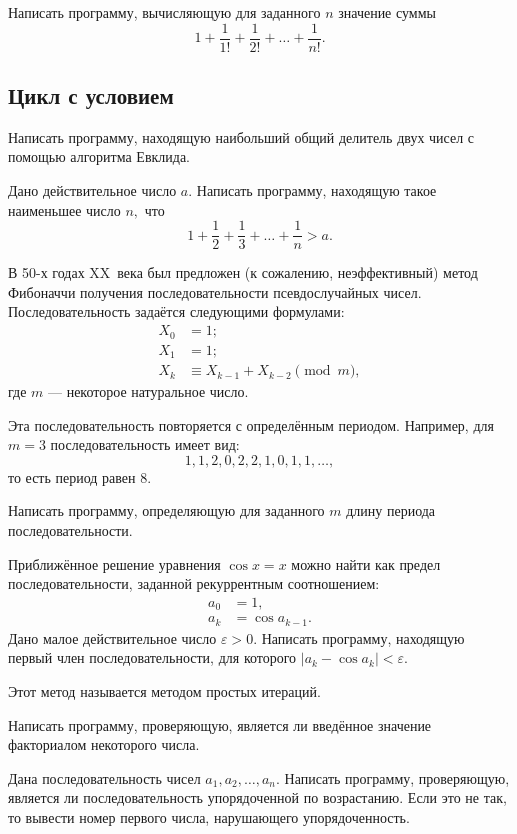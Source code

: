 \task Написать программу, вычисляющую для заданного $n$ значение суммы
\[
1+\frac1{1!} + \frac{1}{2!} + \ldots + \frac1{n!}.
\]

\subsection{Цикл с условием}

\task Написать программу, находящую наибольший общий делитель двух
чисел с помощью алгоритма Евклида.

\task Дано действительное число $a.$ Написать программу, находящую
такое наименьшее число $n,$ что
\[
1 + \frac12 + \frac13 + \ldots + \frac1n > a.
\]

\task В 50-х годах XX~века был предложен (к сожалению, неэффективный)
метод Фибоначчи получения последовательности
псевдослучайных чисел. Последовательность задаётся следующими
формулами:
\begin{align*}
X_0 &= 1;\\
X_1 &= 1;\\
X_k &\equiv X_{k-1} + X_{k-2} \pmod{m},
\end{align*}
где $m$ — некоторое натуральное число.

Эта последовательность повторяется с определённым периодом. Например,
для $m=3$ последовательность имеет вид:
\[1, 1, 2, 0, 2, 2, 1, 0, 1, 1, \ldots,\]
то есть период равен 8.

Написать программу, определяющую для заданного $m$ длину периода
последовательности.

\task Приближённое решение уравнения $\cos x = x$ можно найти как
предел последовательности, заданной рекуррентным соотношением:
\begin{align*}
  a_0 &= 1,\\
  a_k &= \cos a_{k-1}.
\end{align*}
Дано малое действительное число $\varepsilon > 0$. Написать программу,
находящую первый член последовательности, для которого $|a_k - \cos
a_k| < \varepsilon.$

Этот метод называется методом простых итераций.

\task Написать программу, проверяющую, является ли введённое значение
факториалом некоторого числа.

\task Дана последовательность чисел $a_1, a_2, \ldots, a_n.$ Написать
программу, проверяющую, является ли последовательность упорядоченной
по возрастанию. Если это не так, то вывести номер первого числа,
нарушающего упорядоченность.

